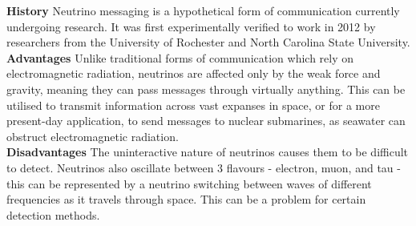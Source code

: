 \documentclass[a0paper,portrait]{baposter}
\begin{document}
\begin{poster}
{\textbf{History}
Neutrino messaging is a hypothetical form of communication currently undergoing research. 
It was first experimentally verified to work in 2012 by researchers from the
University of Rochester and North Carolina State University.\\
\textbf{Advantages}
Unlike traditional forms of communication which rely on electromagnetic radiation, neutrinos are
affected only by the weak force and gravity, meaning they can pass messages through virtually
anything.
This can be utilised to transmit information across vast expanses in space, or for a more present-day application,
to send messages to nuclear submarines, as seawater can obstruct
electromagnetic radiation.\\
\textbf{Disadvantages}
The uninteractive nature of neutrinos causes them to be difficult to detect. Neutrinos also oscillate
between 3 flavours - electron, muon, and tau - this can be represented by a neutrino switching
between waves of different frequencies as it travels through space. This can be a
problem for certain detection methods.

}
\end{poster}
\end{document}
